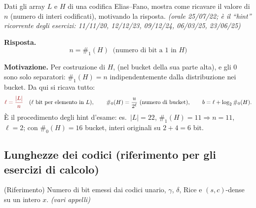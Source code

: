 \begin{domanda}
Dati gli array $L$ e $H$ di una codifica Elias--Fano, mostra come ricavare il valore di $n$
(numero di interi codificati), motivando la risposta. \emph{(orale 25/07/22; \`e il ``hint''
ricorrente degli esercizi: 11/11/20, 12/12/23, 09/12/24, 06/03/25, 23/06/25)}
\end{domanda}

\textbf{Risposta.}
\[
\boxed{\ n=\#_1(H)\ \text{ (numero di bit a 1 in $H$)}\ }
\]

\textbf{Motivazione.} Per costruzione di $H$,  (nel bucket della sua parte alta), e gli 0 sono solo separatori:
$\#_1(H)=n$ indipendentemente dalla distribuzione nei bucket. Da qui si ricava tutto:
\[
\kw{\ell=\frac{|L|}{n}}\quad(\text{$\ell$ bit per elemento in }L),
\qquad
\#_0(H)=\frac{u}{2^{\ell}}\ (\text{numero di bucket}),
\qquad
b=\ell+\log_2\#_0(H).
\]
\`E il procedimento degli hint d'esame: es.\ $|L|=22$, $\#_1(H)=11\Rightarrow n=11$, $\ell=2$;
con $\#_0(H)=16$ bucket, interi originali su $2+4=6$ bit.

\subsection*{ Lunghezze dei codici (riferimento per gli esercizi di calcolo)}

\begin{domanda}
(Riferimento) Numero di bit emessi dai codici unario, $\gamma$, $\delta$, Rice e $(s,c)$-dense su
un intero $x$. \emph{(vari appelli)}
\end{domanda}

